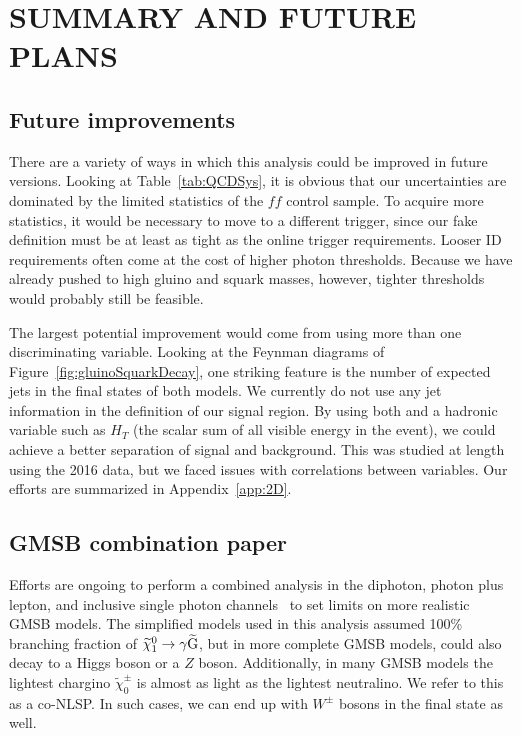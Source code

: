 \chapter{SUMMARY AND FUTURE PLANS}
\label{chap:Conclusions}

\section{Future improvements}
\label{sec:future}

There are a variety of ways in which this analysis could be improved in
future versions. Looking at Table~\ref{tab:QCDSys}, it is obvious that 
our uncertainties are dominated by the limited statistics of the $ff$ control 
sample. To acquire more statistics, it would be necessary to move to a
different trigger, since our fake definition must be at least as tight as 
the online trigger requirements. Looser ID requirements often
come at the cost of higher photon \pT thresholds. Because we 
have already pushed to high gluino and squark masses, however,
tighter \pT thresholds would probably still be feasible.

The largest potential improvement would come from using more than 
one discriminating variable. Looking at the Feynman diagrams of 
Figure~\ref{fig:gluinoSquarkDecay}, one striking feature is the 
number of expected jets in the final states of both models. We 
currently do not use any jet information in the definition of our 
signal region. By using both \ETmiss and a hadronic variable 
such as $H_T$ (the scalar sum of all visible energy in the event), 
we could achieve a better separation of signal and background.
This was studied at length using the 2016 data, but we faced issues
with correlations between variables. Our efforts are summarized
in Appendix~\ref{app:2D}.

\section{GMSB combination paper}
\label{sec:combo}
Efforts are ongoing to perform a combined analysis in the diphoton,
photon plus lepton, and inclusive single photon channels~\cite{PhotonHT, PhotonMET} to set limits on 
more realistic GMSB models. The simplified models used in this 
analysis assumed 100\% branching fraction of $\widetilde{\chi}^{0}_{1} \rightarrow \gamma\widetilde{\mathrm{G}}$,
but in more complete GMSB models, \neutralino could also decay to a Higgs boson 
or a $Z$ boson. Additionally, in many GMSB models the lightest chargino $\widetilde{\chi}^\pm_0$
is almost as light as the lightest neutralino. We refer to this as a co-NLSP. In such cases, 
we can end up with $W^\pm$ bosons in the final state as well. 

